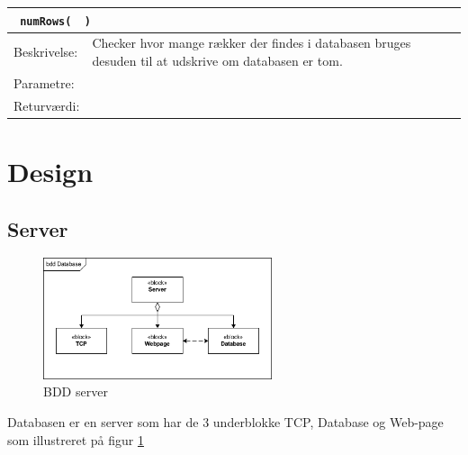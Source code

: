 \begin{table}[H]
\begin{tabular}{l p{12.5cm}}
\multicolumn{2}{l}{\texttt{\textcolor{blue}{} numRows( \textcolor{blue}{} )}} \\
\hline
Beskrivelse:&Checker hvor mange rækker der findes i databasen bruges desuden til at udskrive om databasen er tom.\\
Parametre:&\\
Returværdi:&\\
\end{tabular}
\end{table}

\section{Design}
\subsection{Server}
\begin{figure}[htbp]
	\centering
	\includegraphics[width=0.6\textwidth]{billeder/bdd_server}
	\caption{BDD server}
	\label{fig:bdd_server}
\end{figure}

Databasen er en server som har de 3 underblokke TCP, Database og Web-page som illustreret på figur \ref{fig:bdd_server}

